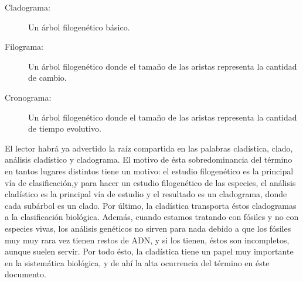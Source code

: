 \begin{description}
\item[Cladograma:] Un árbol filogenético básico.
\item[Filograma:] Un árbol filogenético donde el tamaño de las aristas
  representa la cantidad de cambio.
\item[Cronograma:] Un árbol filogenético donde el tamaño de las
  aristas representa la cantidad de tiempo evolutivo.
\end{description}

El lector habrá ya advertido la raíz compartida en las palabras
cladística, clado, análisis cladístico y cladograma. El motivo de ésta
sobredominancia del término en tantos lugares distintos tiene un
motivo: el estudio filogenético es la principal vía de clasificación,y
para hacer un estudio filogenético de las especies, el
análisis cladístico es la principal vía de estudio y el resultado es
un cladograma, donde cada subárbol es un clado. Por último, la
cladística transporta éstos cladogramas a la clasificación biológica.
Además, cuando estamos tratando con fósiles y no con especies vivas,
los análisis genéticos no sirven para nada debido a que los fósiles
muy muy rara vez tienen restos de ADN, y si los tienen, éstos son
incompletos, aunque suelen servir. Por todo ésto, la cladística tiene
un papel muy importante en la sistemática biológica, y de ahí la alta
ocurrencia del término en éste documento.
